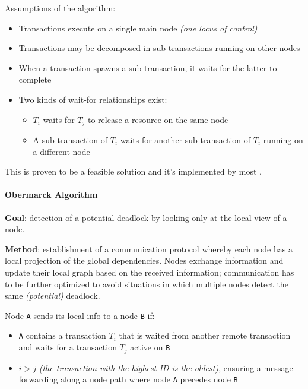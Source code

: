 \documentclass[english]{article}
\begin{document}
Assumptions of the algorithm:

\begin{itemize}
  \item Transactions execute on a single main node \textit{(one locus of control)}
  \item Transactions may be decomposed in sub-transactions running on other nodes
  \item When a transaction spawns a sub-transaction, it waits for the latter to complete
  \item Two kinds of wait-for relationships exist:
        \begin{itemize}
          \item \(T_i\) waits for \(T_j\) to release a resource on the same node
          \item A sub transaction of \(T_i\) waits for another sub transaction of \(T_i\) running on a different node
        \end{itemize}
\end{itemize}

\bigskip
This is proven to be a feasible solution and it's implemented by most \dbms.

\paragraph{Obermarck Algorithm}

\textbf{Goal}:
detection of a potential deadlock by looking only at the local view of a node.

\textbf{Method}:
establishment of a communication protocol whereby each node has a local projection of the global dependencies.
Nodes exchange information and update their local graph based on the received information;
communication has to be further optimized to avoid situations in which multiple nodes detect the same \textit{(potential)} deadlock.

\bigskip
Node \texttt{A} sends its local info to a node \texttt{B} if:

\begin{itemize}
  \item \texttt{A} contains a transaction \(T_i\) that is waited from another remote transaction and waits for a transaction \(T_j\) active on \texttt{B}
  \item \(i > j\) \textit{(the transaction with the highest ID is the oldest)}, ensuring a message forwarding along a node path where node \texttt{A} precedes node \texttt{B}
\end{itemize}
\end{document}

